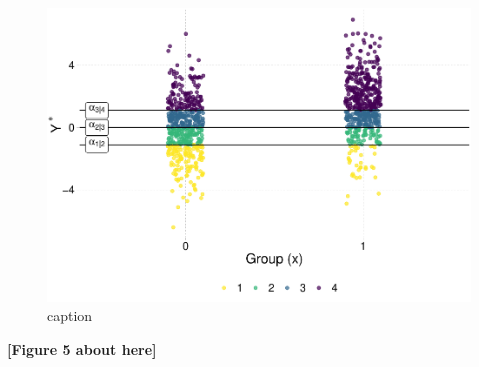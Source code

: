 \documentclass[
  man,floatsintext]{apa6}
\begin{document}
\normalsize

\scriptsize

\begin{figure}

{\centering \includegraphics{paper_files/figure-latex/fig-sim-from-latent-1} 

}

\caption{caption}\label{fig:fig-sim-from-latent}
\end{figure}

\begin{center}\textbf{[Figure 5 about here]} \end{center}

\normalsize

\scriptsize
\end{document}
